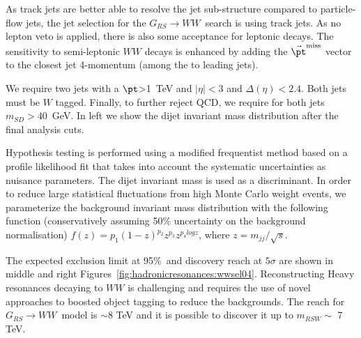 As track jets are better able to resolve the jet sub-structure compared to particle-flow jets, the jet selection for the $G_{RS} \rightarrow WW$\ search is using track jets. As no lepton veto is applied, there is also some acceptance for leptonic decays. The sensitivity to semi-leptonic $WW$ decays is enhanced by adding the $\vec{\pt}^{\textrm{miss}}$ vector to the closest jet 4-momentum (among the to leading jets).

We require two jets with a $\pt$>1~TeV and $|\eta|<3$ and $\Delta(\eta)<2.4$. Both jets must be $W$ tagged. Finally, to further reject QCD, we require for both jets $m_{SD}>40$~GeV. In left  we show the dijet invariant mass distribution after the final analysis cuts.

Hypothesis testing is performed using a modified frequentist method based on a profile likelihood fit that takes into account the systematic uncertainties as nuisance parameters. The dijet invariant mass is used as a discriminant. In order to reduce large statistical fluctuations from high Monte Carlo weight events, we parameterize the background invariant mass distribution with the following function (conservatively assuming 50\% uncertainty on the background normalisation) $f(z)=p_1(1-z)^{p_2}z^{p_3}z^{p_{4}logz}$, where $z=m_{jj}/\sqrt{s}$.

The expected exclusion limit at 95\%~\cl and discovery reach at $5 \sigma$ are shown in middle and right Figures~\ref{fig:hadronicresonances:wwsel04}. Reconstructing Heavy resonances decaying to $WW$ is challenging and requires the use of novel approaches to boosted object tagging to reduce the backgrounds. The reach for $G_{RS} \rightarrow WW$\ model is $\sim8$ TeV and it is possible to discover it up to $m_{RSW}\sim$ 7 TeV.

